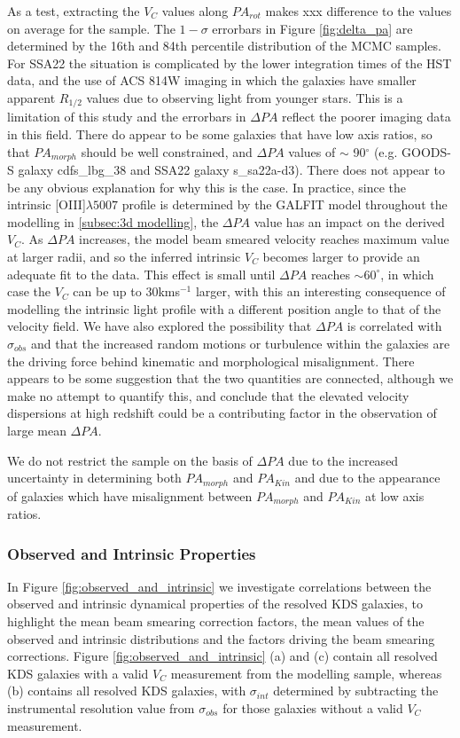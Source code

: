\documentclass[fleqn,usenatbib]{mn2e}
\begin{document}
As a test, extracting the $V_{C}$ values along $PA_{rot}$ makes xxx difference to the values on average for the sample. 
The $1-\sigma$ errorbars in Figure \ref{fig:delta_pa} are determined by the 16th and 84th percentile distribution of the MCMC samples.
For SSA22 the situation is complicated by the lower integration times of the HST data, and the use of ACS 814W imaging in which the galaxies have smaller apparent $R_{1/2}$ values due to observing light from younger stars.
This is a limitation of this study and the errorbars in $\Delta PA$ reflect the poorer imaging data in this field.
There do appear to be some galaxies that have low axis ratios, so that $PA_{morph}$ should be well constrained, and $\Delta PA$ values of $\sim$ 90$^{\circ}$ (e.g. GOODS-S galaxy cdfs\_lbg\_38 and SSA22 galaxy s\_sa22a-d3).
There does not appear to be any obvious explanation for why this is the case.
In practice, since the intrinsic [OIII]$\lambda5007$ profile is determined by the GALFIT model throughout the modelling in \cref{subsec:3d modelling}, the $\Delta PA$ value has an impact on the derived $V_{C}$.
As $\Delta PA$ increases, the model beam smeared velocity reaches maximum value at larger radii, and so the inferred intrinsic $V_{C}$ becomes larger to provide an adequate fit to the data.
This effect is small until $\Delta PA$ reaches $\sim 60^{\circ}$, in which case the $V_{C}$ can be up to 30kms$^{-1}$ larger, with this an interesting consequence of modelling the intrinsic light profile with a different position angle to that of the velocity field.
We have also explored the possibility that $\Delta PA$ is correlated with $\sigma_{obs}$ and that the increased random motions or turbulence within the galaxies are the driving force behind kinematic and morphological misalignment.
There appears to be some suggestion that the two quantities are connected, although we make no attempt to quantify this, and conclude that the elevated velocity dispersions at high redshift could be a contributing factor in the observation of large mean $\Delta PA$.

We do not restrict the sample on the basis of $\Delta PA$ due to the increased uncertainty in determining both $PA_{morph}$ and $PA_{Kin}$ and due to the appearance of galaxies which have misalignment between $PA_{morph}$ and $PA_{Kin}$ at low axis ratios.  

\subsubsection{Observed and Intrinsic Properties}\label{subsubsec:observed_and_intrinsic}
In Figure \ref{fig:observed_and_intrinsic} we investigate correlations between the observed and intrinsic dynamical properties of the resolved KDS galaxies, to highlight the mean beam smearing correction factors, the mean values of the observed and intrinsic distributions and the factors driving the beam smearing corrections.
Figure \ref{fig:observed_and_intrinsic} (a) and (c) contain all resolved KDS galaxies with a valid $V_{C}$ measurement from the modelling sample, whereas (b) contains all resolved KDS galaxies, with $\sigma_{int}$ determined by subtracting the instrumental resolution value from $\sigma_{obs}$ for those galaxies without a valid $V_{C}$ measurement. 
\end{document}
